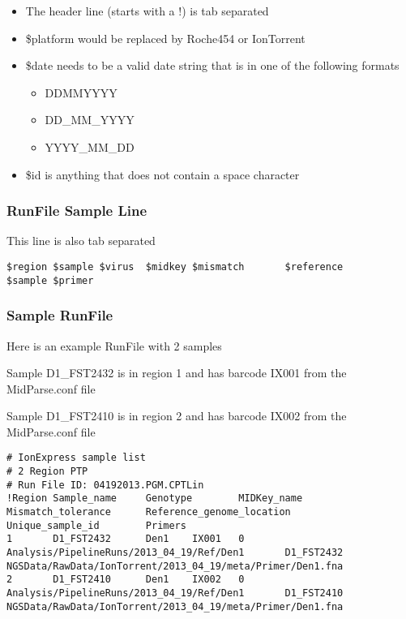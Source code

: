 \documentclass{article}
\begin{document}
\begin{itemize}
 \item The header line (starts with a !) is tab separated
 \item \$platform would be replaced by Roche454 or IonTorrent
 \item \$date needs to be a valid date string that is in one of the following formats
 \begin{itemize}
  \item DDMMYYYY
  \item DD\_MM\_YYYY
  \item YYYY\_MM\_DD
 \end{itemize}
 \item \$id is anything that does not contain a space character
\end{itemize}
\subsubsection{RunFile Sample Line}
This line is also tab separated
\begin{lstlisting}
$region $sample $virus  $midkey $mismatch       $reference      $sample $primer
\end{lstlisting}

\subsubsection{Sample RunFile}
Here is an example RunFile with 2 samples

Sample D1\_FST2432 is in region 1 and has barcode IX001 from the MidParse.conf file

Sample D1\_FST2410 is in region 2 and has barcode IX002 from the MidParse.conf file

\begin{landscape}
{\tiny
\begin{lstlisting}
# IonExpress sample list
# 2 Region PTP
# Run File ID: 04192013.PGM.CPTLin
!Region Sample_name     Genotype        MIDKey_name     Mismatch_tolerance      Reference_genome_location       Unique_sample_id        Primers
1       D1_FST2432      Den1    IX001   0       Analysis/PipelineRuns/2013_04_19/Ref/Den1       D1_FST2432      NGSData/RawData/IonTorrent/2013_04_19/meta/Primer/Den1.fna
2       D1_FST2410      Den1    IX002   0       Analysis/PipelineRuns/2013_04_19/Ref/Den1       D1_FST2410      NGSData/RawData/IonTorrent/2013_04_19/meta/Primer/Den1.fna
\end{lstlisting}
}
\end{landscape}
\end{document}
